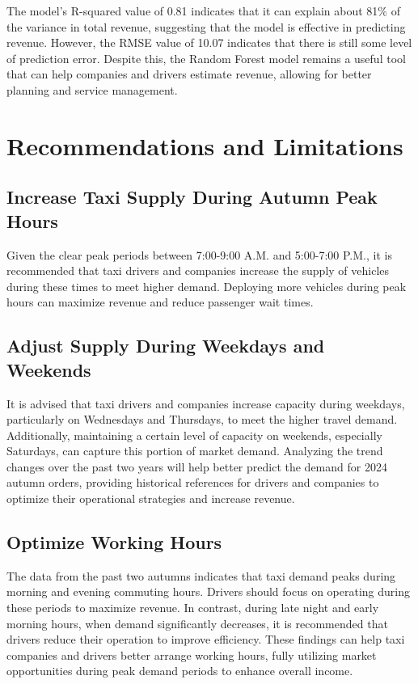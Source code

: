 \documentclass[11pt]{article}
\begin{document}
The model’s R-squared value of 0.81 indicates that it can explain about 81\% of the variance in total revenue, suggesting that the model is effective in predicting revenue. However, the RMSE value of 10.07 indicates that there is still some level of prediction error. Despite this, the Random Forest model remains a useful tool that can help companies and drivers estimate revenue, allowing for better planning and service management.

\section{Recommendations and Limitations}

\subsection{Increase Taxi Supply During Autumn Peak Hours}
Given the clear peak periods between 7:00-9:00 A.M. and 5:00-7:00 P.M., it is recommended that taxi drivers and companies increase the supply of vehicles during these times to meet higher demand. Deploying more vehicles during peak hours can maximize revenue and reduce passenger wait times.

\subsection{Adjust Supply During Weekdays and Weekends}
It is advised that taxi drivers and companies increase capacity during weekdays, particularly on Wednesdays and Thursdays, to meet the higher travel demand. Additionally, maintaining a certain level of capacity on weekends, especially Saturdays, can capture this portion of market demand. Analyzing the trend changes over the past two years will help better predict the demand for 2024 autumn orders, providing historical references for drivers and companies to optimize their operational strategies and increase revenue.

\subsection{Optimize Working Hours}
The data from the past two autumns indicates that taxi demand peaks during morning and evening commuting hours. Drivers should focus on operating during these periods to maximize revenue. In contrast, during late night and early morning hours, when demand significantly decreases, it is recommended that drivers reduce their operation to improve efficiency. These findings can help taxi companies and drivers better arrange working hours, fully utilizing market opportunities during peak demand periods to enhance overall income.
\end{document}
